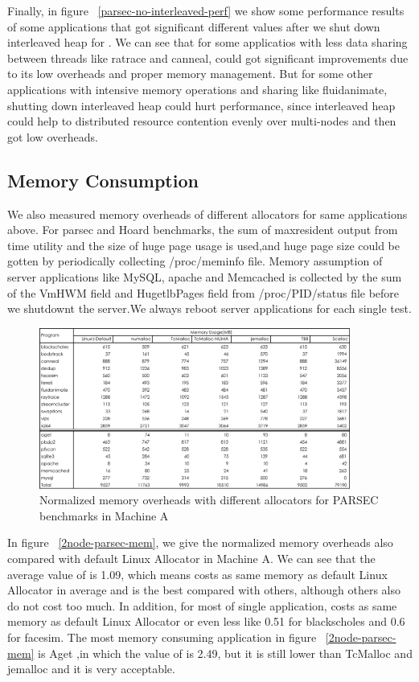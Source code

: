 Finally, in figure ~\ref{parsec-no-interleaved-perf} we show some performance results of some applications that got significant different values after we shut down interleaved heap for \NM{}. We can see that for some applicatios with less data sharing between threads like ratrace and canneal, \NM{} could got significant improvements due to its low overheads and proper memory management. But for some other applications with intensive memory operations and sharing like fluidanimate, shutting down interleaved heap could hurt performance, since interleaved heap could help to distributed resource contention evenly over multi-nodes and then got low overheads.

\subsection{Memory Consumption}
\label{sec:memory}

We also measured memory overheads of different allocators for same applications above. For parsec and Hoard benchmarks, the sum of maxresident output from time utility and the size of huge page usage is used,and huge page size could be gotten by periodically collecting /proc/meminfo file. Memory assumption of server applications like MySQL, apache and Memcached is collected by the sum of the VmHWM field and HugetlbPages field from /proc/PID/status file before we shutdownt the server.We always reboot server applications for each single test. 

\begin{figure}[H]
    \centering
    \includegraphics[width=\textwidth,height=200]{paper/figure/8-node-memory.pdf}
    \caption{Normalized memory overheads with different allocators for PARSEC benchmarks in Machine A}
    \label{8node-parsec-mem}
\end{figure}

In figure ~\ref{2node-parsec-mem}, we give the normalized memory overheads also compared with default Linux Allocator in Machine A. We can see that the average value of \NM{} is 1.09, which means \NM{} costs as same memory as default Linux Allocator in average and \NM{} is the best compared with others, although others also do not cost too much. In addition, for most of single application, \NM{} costs as same memory as default Linux Allocator or even less like 0.51 for blackscholes and 0.6 for facesim. The most memory consuming application in figure ~\ref{2node-parsec-mem} is Aget ,in which the value of \NM{} is 2.49, but it is still lower than TcMalloc and jemalloc and it is very acceptable. 

